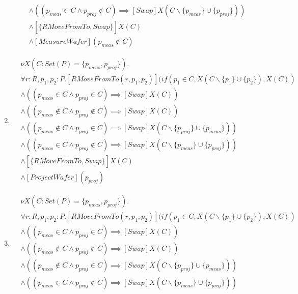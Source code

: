 \begin{enumerate}
\begin{align*}
            &\wedge ((p_\mathit{meas} \in C \wedge p_\mathit{proj} \notin C) \implies [Swap]X(C\backslash\{p_\mathit{meas}\} \cup \{p_\mathit{proj}\}))\\
            &\wedge [\overline{\{RMoveFromTo, Swap\}}]X(C)\\
            &\wedge [MeasureWafer](p_\mathit{meas} \notin C)
        \end{align*}
    \item \begin{align*}
    		&\nu X(C : Set(P) = \{p_\mathit{meas},p_\mathit{proj}\}).\\
            & \forall r:R, p_1, p_2 : P . [RMoveFromTo(r, p_1, p_2)](if(p_1 \in C, X(C\backslash\{p_1\}\cup\{p_2\}), X(C))\\
            &\wedge ((p_\mathit{meas} \in C \wedge p_\mathit{proj} \in C) \implies [Swap]X(C))\\
            &\wedge ((p_\mathit{meas} \notin C \wedge p_\mathit{proj} \notin C) \implies [Swap]X(C))\\
            &\wedge ((p_\mathit{meas} \notin C \wedge p_\mathit{proj} \in C) \implies [Swap]X(C\backslash\{p_\mathit{proj}\} \cup \{p_\mathit{meas}\}))\\
            &\wedge ((p_\mathit{meas} \in C \wedge p_\mathit{proj} \notin C) \implies [Swap]X(C\backslash\{p_\mathit{meas}\} \cup \{p_\mathit{proj}\}))\\
            &\wedge [\overline{\{RMoveFromTo, Swap\}}]X(C)\\
            &\wedge [ProjectWafer](p_\mathit{proj})
        \end{align*}
    \item \begin{align*}
    		&\nu X(C : Set(P) = \{p_\mathit{meas},p_\mathit{proj}\}).\\
            & \forall r:R, p_1, p_2 : P . [RMoveFromTo(r, p_1, p_2)](if(p_1 \in C, X(C\backslash\{p_1\}\cup\{p_2\}), X(C))\\
            &\wedge ((p_\mathit{meas} \in C \wedge p_\mathit{proj} \in C) \implies [Swap]X(C))\\
            &\wedge ((p_\mathit{meas} \notin C \wedge p_\mathit{proj} \notin C) \implies [Swap]X(C))\\
            &\wedge ((p_\mathit{meas} \notin C \wedge p_\mathit{proj} \in C) \implies [Swap]X(C\backslash\{p_\mathit{proj}\} \cup \{p_\mathit{meas}\}))\\
            &\wedge ((p_\mathit{meas} \in C \wedge p_\mathit{proj} \notin C) \implies [Swap]X(C\backslash\{p_\mathit{meas}\} \cup \{p_\mathit{proj}\}))\\

\end{align*}
\end{enumerate}
